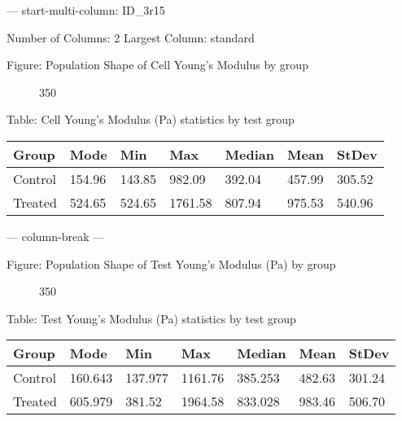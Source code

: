 \documentclass[
  paper=a4,
  ,captions=tableheading
]{scrartcl}
\makeatletter
\newenvironment{Shaded}{}{}
\newcommand{\NormalTok}[1]{#1}
\newcommand*\pandocbounded[1]{%
  \sbox\pandoc@box{#1}%
  \Gscale@div\@tempa{\textheight}{\dimexpr\ht\pandoc@box+\dp\pandoc@box\relax}%
  \Gscale@div\@tempb{\linewidth}{\wd\pandoc@box}%
  \ifdim\@tempb\p@<\@tempa\p@\let\@tempa\@tempb\fi%
  \ifdim\@tempa\p@<\p@\scalebox{\@tempa}{\usebox\pandoc@box}%
  \else\usebox{\pandoc@box}%
  \fi%
}
\makeatother
\begin{document}
--- start-multi-column: ID\_3r15

\begin{Shaded}
\begin{Highlighting}[]
\NormalTok{Number of Columns: 2}
\NormalTok{Largest Column: standard}
\end{Highlighting}
\end{Shaded}

Figure: Population Shape of Cell Young's Modulus by group

\begin{figure}
\centering
\pandocbounded{}
\caption{350}
\end{figure}

Table: Cell Young's Modulus (Pa) statistics by test group

\begin{longtable}[]{@{}lllllll@{}}
\toprule\noalign{}
Group & Mode & Min & Max & Median & Mean & StDev \\
\midrule\noalign{}
\endhead
\bottomrule\noalign{}
\endlastfoot
Control & 154.96 & 143.85 & 982.09 & 392.04 & 457.99 & 305.52 \\
Treated & 524.65 & 524.65 & 1761.58 & 807.94 & 975.53 & 540.96 \\
\end{longtable}

--- column-break ---

Figure: Population Shape of Test Young's Modulus (Pa) by group

\begin{figure}
\centering
\pandocbounded{}
\caption{350}
\end{figure}

Table: Test Young's Modulus (Pa) statistics by test group

\begin{longtable}[]{@{}lllllll@{}}
\toprule\noalign{}
Group & Mode & Min & Max & Median & Mean & StDev \\
\midrule\noalign{}
\endhead
\bottomrule\noalign{}
\endlastfoot
Control & 160.643 & 137.977 & 1161.76 & 385.253 & 482.63 & 301.24 \\
Treated & 605.979 & 381.52 & 1964.58 & 833.028 & 983.46 & 506.70 \\
\end{longtable}
\end{document}
